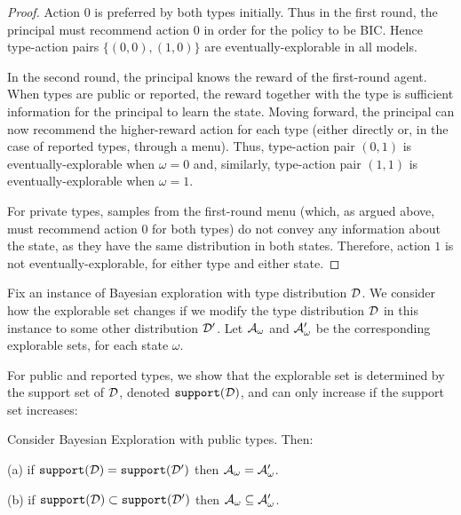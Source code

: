 \begin{proof}
Action 0 is preferred by both types initially. Thus in the first round, the principal must recommend action $0$ in order for the policy to be BIC.  Hence type-action pairs $\{(0,0),(1,0)\}$ are eventually-explorable in all models.

In the second round, the principal knows the reward of the first-round agent.  When types are public or reported, the reward together with the type is sufficient information for the principal to learn the state.  Moving forward, the principal can now recommend the higher-reward action for each type (either directly or, in the case of reported types, through a menu).  Thus, type-action pair $(0,1)$ is eventually-explorable when $\omega=0$ and, similarly, type-action pair $(1,1)$ is eventually-explorable when $\omega=1$.

For private types, samples from the first-round menu (which, as argued above, must recommend action $0$ for both types) do not convey any information about the state, as they have the same distribution in both states. Therefore, action $1$ is not eventually-explorable, for either type and either state.
\end{proof}

Fix an instance of Bayesian exploration with type distribution $\mathcal{D}$. We consider how the explorable set changes if we modify the type distribution $\mathcal{D}$ in this instance to some other distribution $\mathcal{D}'$. Let $\mathcal{A}_{\omega}$ and $\mathcal{A}_{\omega}'$ be the corresponding explorable sets, for each state $\omega$.


For public and reported types, we show that the explorable set is determined by the support set of $\mathcal{D}$, denoted $\mathtt{support}(\mathcal{D})$, and can only increase if the support set increases:


\begin{claim}\label{cl:statics-diversity-public}
Consider Bayesian Exploration with public types. Then:
\begin{OneLiners}
\item[(a)] if $\mathtt{support}(\mathcal{D})=\mathtt{support}(\mathcal{D}')$ then $\mathcal{A}_{\omega}=\mathcal{A}_{\omega}'$.
\item[(b)] if $\mathtt{support}(\mathcal{D})\subset \mathtt{support}(\mathcal{D}')$ then $\mathcal{A}_{\omega}\subseteq \mathcal{A}_{\omega}'$.
\end{OneLiners}
\end{claim}

